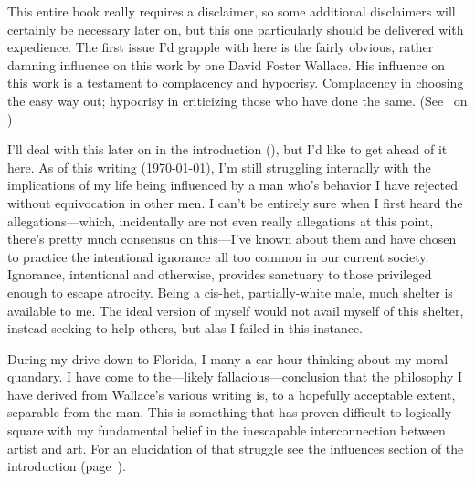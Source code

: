 \setlength{\parskip}{0.75\baselineskip}
\label{chap:disclaimer}
{\normalsize This entire book really requires a disclaimer, so some additional disclaimers will certainly be necessary later on, but this one particularly should be delivered with expedience.
The first issue I'd grapple with here is the fairly obvious, rather damning influence on this work by one David Foster Wallace.
His influence on this work is a testament to complacency and hypocrisy.
Complacency in choosing the easy way out; hypocrisy in criticizing those who have done the same.
(See~ on )

I'll deal with this later on in the introduction (), but I'd like to get ahead of it here.
As of this writing (\today), I'm still struggling internally with the implications of my life being influenced by a man who's behavior I have rejected without equivocation in other men.
I can't be entirely sure when I first heard the allegations---which, incidentally are not even really allegations at this point, there's pretty much consensus on this---I've known about them and have chosen to practice the intentional ignorance all too common in our current society.
Ignorance, intentional and otherwise, provides sanctuary to those privileged enough to escape atrocity.
Being a cis-het, partially-white male, much shelter is available to me.
The ideal version of myself would not avail myself of this shelter, instead seeking to help others, but alas I failed in this instance.

During my drive down to Florida, I many a car-hour thinking about my moral quandary.
I have come to the---likely fallacious---conclusion that the philosophy I have derived from Wallace's various writing is, to a hopefully acceptable extent, separable from the man.
This is something that has proven difficult to logically square with my fundamental belief in the inescapable interconnection between artist and art.
For an elucidation of that struggle see the influences section of the introduction (page~\pageref{sec:influences}).

}
